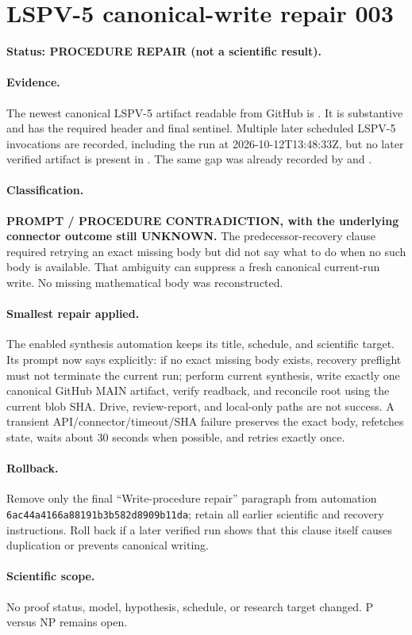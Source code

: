 \documentclass[11pt]{article}
\begin{document}
\section*{LSPV-5 canonical-write repair 003}
\textbf{Status: PROCEDURE REPAIR (not a scientific result).}

\paragraph{Evidence.}
The newest canonical LSPV-5 artifact readable from GitHub is
.
It is substantive and has the required header and final sentinel.  Multiple later
scheduled LSPV-5 invocations are recorded, including the run at
2026-10-12T13:48:33Z, but no later verified artifact is present in
.  The same gap was already recorded by
 and
.

\paragraph{Classification.}
\textbf{PROMPT / PROCEDURE CONTRADICTION, with the underlying connector outcome still
UNKNOWN.}  The predecessor-recovery clause required retrying an exact missing body but
did not say what to do when no such body is available.  That ambiguity can suppress a
fresh canonical current-run write.  No missing mathematical body was reconstructed.

\paragraph{Smallest repair applied.}
The enabled synthesis automation keeps its title, schedule, and scientific target.
Its prompt now says explicitly: if no exact missing body exists, recovery preflight must
not terminate the current run; perform current synthesis, write exactly one canonical
GitHub MAIN artifact, verify readback, and reconcile root  using the
current blob SHA.  Drive, review-report, and local-only paths are not success.  A
transient API/connector/timeout/SHA failure preserves the exact body, refetches state,
waits about 30 seconds when possible, and retries exactly once.

\paragraph{Rollback.}
Remove only the final ``Write-procedure repair'' paragraph from automation
\texttt{6ac44a4166a88191b3b582d8909b11da}; retain all earlier scientific and recovery
instructions.  Roll back if a later verified run shows that this clause itself causes
duplication or prevents canonical writing.

\paragraph{Scientific scope.}
No proof status, model, hypothesis, schedule, or research target changed.  P versus NP
remains open.

\end{document}

